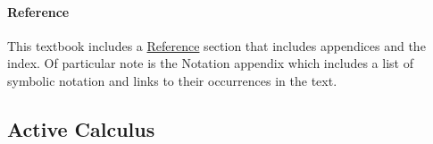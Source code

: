 \documentclass[10pt,]{article}
\begin{document}
\paragraph[{Reference}]{Reference}\hypertarget{paragraphs-reference}{}
\hypertarget{p-20}{}%
This textbook includes a \href{https://books.aimath.org/aata/backmatter.html}{Reference} section that includes appendices and the index. Of particular note is the Notation appendix which includes a list of symbolic notation and links to their occurrences in the text.%
\typeout{************************************************}
\typeout{************************************************}
\subsection[{Active Calculus}]{Active Calculus}\label{subsection-ac}
\leavevmode%
\end{document}
